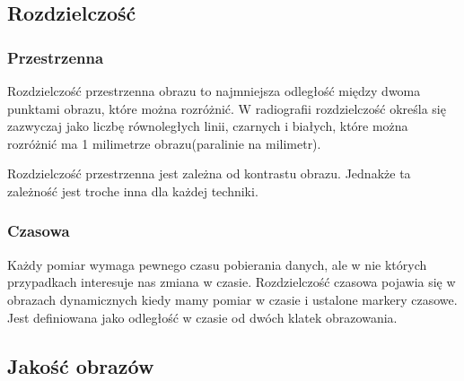 \subsection{Rozdzielczość}

\subsubsection{Przestrzenna}

\par
Rozdzielczość przestrzenna obrazu to najmniejsza odległość między dwoma punktami obrazu, które można rozróżnić.
W radiografii rozdzielczość określa się zazwyczaj jako liczbę równoległych linii, czarnych i białych, które można rozróżnić ma 1 milimetrze obrazu(paralinie na milimetr).

\par
Rozdzielczość przestrzenna jest zależna od kontrastu obrazu.
Jednakże ta zależność jest troche inna dla każdej techniki.

\subsubsection{Czasowa}

Każdy pomiar wymaga pewnego czasu pobierania danych, ale w nie których przypadkach interesuje nas zmiana w czasie.
Rozdzielczość czasowa pojawia się w obrazach dynamicznych kiedy mamy pomiar w czasie i ustalone markery czasowe.
Jest definiowana jako odległość w czasie od dwóch klatek obrazowania.

\subsection{Jakość obrazów}
\label{sec:image-quality}

